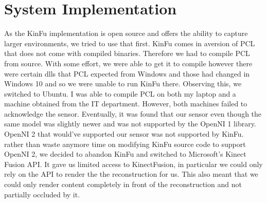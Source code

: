 \section{System Implementation}
As the KinFu implementation is open source and offers the ability to capture larger environments, we tried to use that first. KinFu comes in aversion of PCL that does not come with compiled binaries. Therefore we had to compile PCL from source. With some effort, we were able to get it to compile however there were certain dlls that PCL expected from Windows and those had changed in Windows 10 and so we were unable to run KinFu there. Observing this, we switched to Ubuntu. I was able to compile PCL on both my laptop and a machine obtained from the IT department. However, both machines failed to acknowledge the sensor. Eventually, it was found that our sensor even though the same model was slightly newer and was not supported by the OpenNI 1 library. OpenNI 2 that would've supported our sensor was not supported by KinFu. rather than waste anymore time on modifying KinFu source code to support OpenNI 2, we decided to abandon KinFu and switched to Microsoft's Kinect Fusion API. It gave us limited access to KinectFusion, in particular we could only rely on the API to render the the reconstruction for us. This also meant that we could only render content completely in front of the reconstruction and not partially occluded by it.